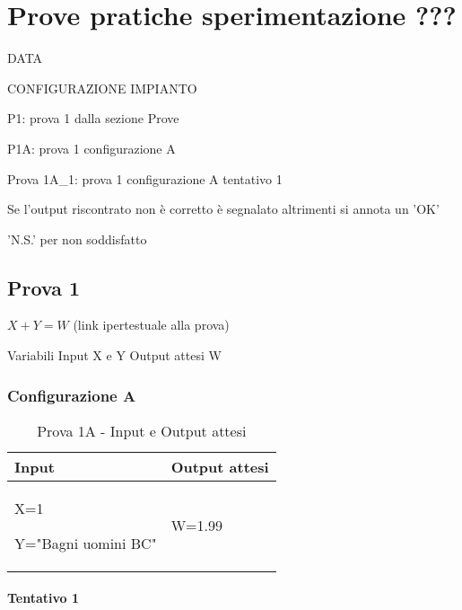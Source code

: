 \documentclass[../Sperimentazione.tex]{subfiles}
\begin{document}
\section{Prove pratiche sperimentazione ???}

	DATA
	
	CONFIGURAZIONE IMPIANTO

	
	P1: prova 1 dalla sezione Prove
	
	P1A: prova 1 configurazione A
	
	Prova 1A\_1: prova 1 configurazione A tentativo 1
	
	
	Se l'output riscontrato non è corretto è segnalato altrimenti si annota un 'OK'
	
	'N.S.' per non soddisfatto

	\newpage
	\subsection{Prova 1}
	
		$X+Y=W$	(link ipertestuale alla prova)
	
		Variabili Input	X e Y
		Output attesi W
	
		\newpage
		\subsubsection{Configurazione A}
				
			\begin{table} [h]
				\centering
				\begin{tabularx}{0.8\textwidth}{XX}
					\textbf{Input} & \textbf{Output attesi} \\
					\toprule
					X=1 \par Y="Bagni uomini BC" & W=1.99 \\
					\bottomrule
				\end{tabularx} 
				\caption{Prova 1A - Input e Output attesi}
			\end{table}
				
				
			\paragraph{Tentativo 1}
			
			
\end{document}
